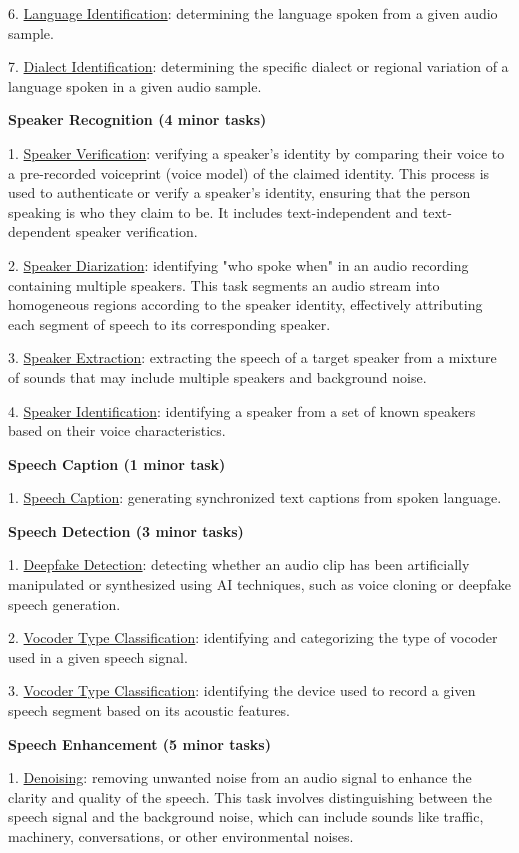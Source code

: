 6. \underline{Language Identification}: determining the language spoken from a given audio sample. 

7. \underline{Dialect Identification}: determining the specific dialect or regional variation of a language spoken in a given audio sample.


\textbf{Speaker Recognition (4 minor tasks)}

1. \underline{Speaker Verification}: verifying a speaker's identity by comparing their voice to a pre-recorded voiceprint (voice model) of the claimed identity. This process is used to authenticate or verify a speaker's identity, ensuring that the person speaking is who they claim to be. It includes text-independent and text-dependent speaker verification.

2. \underline{Speaker Diarization}: identifying "who spoke when" in an audio recording containing multiple speakers. This task segments an audio stream into homogeneous regions according to the speaker identity, effectively attributing each segment of speech to its corresponding speaker. 

3. \underline{Speaker Extraction}: extracting the speech of a target speaker from a mixture of sounds that may include multiple speakers and background noise.

4. \underline{Speaker Identification}: identifying a speaker from a set of known speakers based on their voice characteristics.

\textbf{Speech Caption (1 minor task)} 

1. \underline{Speech Caption}: generating synchronized text captions from spoken language.

\textbf{Speech Detection (3 minor tasks)}

1. \underline{Deepfake Detection}: detecting whether an audio clip has been artificially manipulated or synthesized using AI techniques, such as voice cloning or deepfake speech generation.

2. \underline{Vocoder Type Classification}: identifying and categorizing the type of vocoder used in a given speech signal.

3. \underline{Vocoder Type Classification}: identifying the device used to record a given speech segment based on its acoustic features.


\textbf{Speech Enhancement (5 minor tasks)}	

1. \underline{Denoising}: removing unwanted noise from an audio signal to enhance the clarity and quality of the speech. This task involves distinguishing between the speech signal and the background noise, which can include sounds like traffic, machinery, conversations, or other environmental noises. 

